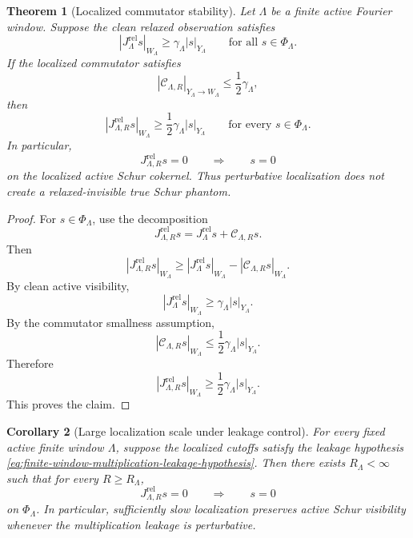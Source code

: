 \documentclass[11pt]{article}
\numberwithin{equation}{section}
\newtheorem{theorem}{Theorem}[section]
\newtheorem{corollary}[theorem]{Corollary}
\begin{document}
\begin{theorem}[Localized commutator stability]\label{thm:localized-commutator-stability}
Let \(\Lambda\) be a finite active Fourier window.  Suppose the clean relaxed observation satisfies
\[
        |J_\Lambda^{\mathrm{rel}}s|_{W_\Lambda}
        \ge
        \gamma_\Lambda |s|_{Y_\Lambda}
        \qquad
        \text{for all }s\in\Phi_\Lambda.
\]
If the localized commutator satisfies
\begin{equation}\label{eq:commutator-smallness-assumption}
        |\mathcal C_{\Lambda,R}|_{Y_\Lambda\to W_\Lambda}
        \le
        \frac12\gamma_\Lambda,
\end{equation}
then
\[
        |J_{\Lambda,R}^{\mathrm{rel}}s|_{W_\Lambda}
        \ge
        \frac12\gamma_\Lambda |s|_{Y_\Lambda}
        \qquad
        \text{for every }s\in\Phi_\Lambda.
\]
In particular,
\[
        J_{\Lambda,R}^{\mathrm{rel}}s=0
        \qquad\Longrightarrow\qquad
        s=0
\]
on the localized active Schur cokernel.  Thus perturbative localization does not create a relaxed-invisible true Schur phantom.
\end{theorem}

\begin{proof}
For \(s\in\Phi_\Lambda\), use the decomposition
\[
        J_{\Lambda,R}^{\mathrm{rel}}s
        =J_\Lambda^{\mathrm{rel}}s+\mathcal C_{\Lambda,R}s.
\]
Then
\[
        |J_{\Lambda,R}^{\mathrm{rel}}s|_{W_\Lambda}
        \ge
        |J_\Lambda^{\mathrm{rel}}s|_{W_\Lambda}
        -|\mathcal C_{\Lambda,R}s|_{W_\Lambda}.
\]
By clean active visibility,
\[
        |J_\Lambda^{\mathrm{rel}}s|_{W_\Lambda}
        \ge
        \gamma_\Lambda |s|_{Y_\Lambda}.
\]
By the commutator smallness assumption,
\[
        |\mathcal C_{\Lambda,R}s|_{W_\Lambda}
        \le
        \frac12\gamma_\Lambda |s|_{Y_\Lambda}.
\]
Therefore
\[
        |J_{\Lambda,R}^{\mathrm{rel}}s|_{W_\Lambda}
        \ge
        \frac12\gamma_\Lambda |s|_{Y_\Lambda}.
\]
This proves the claim.
\end{proof}

\begin{corollary}[Large localization scale under leakage control]\label{cor:large-localization-scale}
For every fixed active finite window \(\Lambda\), suppose the localized cutoffs satisfy the leakage hypothesis \eqref{eq:finite-window-multiplication-leakage-hypothesis}.  Then there exists \(R_\Lambda<\infty\) such that for every \(R\ge R_\Lambda\),
\[
        J_{\Lambda,R}^{\mathrm{rel}}s=0
        \qquad\Longrightarrow\qquad
        s=0
\]
on \(\Phi_\Lambda\).  In particular, sufficiently slow localization preserves active Schur visibility whenever the multiplication leakage is perturbative.
\end{corollary}
\end{document}
